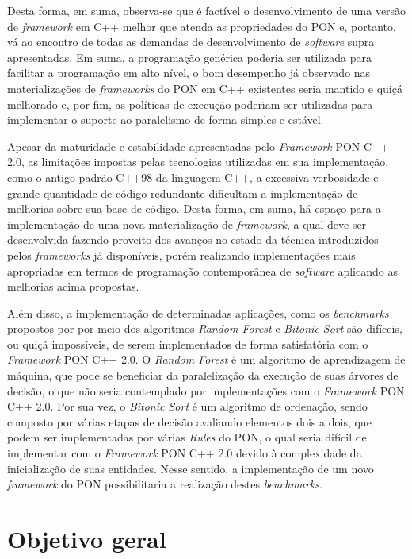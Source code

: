 Desta forma, em suma, observa-se que é factível o desenvolvimento de uma versão de
\textit{framework} em C++ melhor que atenda as propriedades do PON e, portanto,
vá ao encontro de todas as demandas de desenvolvimento de \textit{software} supra
apresentadas. Em suma, a programação genérica poderia ser utilizada para
facilitar a programação em alto nível, o bom desempenho já observado nas
materializações de \textit{frameworks} do PON em C++ existentes seria mantido e
quiçá melhorado e, por fim, as políticas de execução poderiam ser utilizadas
para implementar o suporte ao paralelismo de forma simples e estável.

Apesar da maturidade e estabilidade apresentadas pelo \textit{Framework} PON C++
2.0, as limitações impostas pelas tecnologias utilizadas em sua implementação,
como o antigo padrão C++98 da linguagem C++, a excessiva verbosidade e grande
quantidade de código redundante dificultam a implementação de melhorias sobre
sua base de código. Desta forma, em suma, há espaço para a implementação de uma
nova materialização de \textit{framework}, a qual deve ser desenvolvida fazendo
proveito dos avanços no estado da técnica introduzidos pelos \textit{frameworks}
já disponíveis, porém realizando implementações mais apropriadas em termos de
programação contemporânea de \textit{software} aplicando as melhorias acima
propostas.

Além disso, a implementação de determinadas aplicações, como os
\textit{benchmarks} propostos por  por meio dos
algoritmos \textit{Random Forest} e \textit{Bitonic Sort} são difíceis, ou quiçá
impossíveis, de serem implementados de forma satisfatória com o
\textit{Framework} PON C++ 2.0. O \textit{Random Forest} é um algoritmo de
aprendizagem de máquina, que pode se beneficiar da paralelização da execução de
suas árvores de decisão, o que não seria contemplado por implementações com o
\textit{Framework} PON C++ 2.0. Por sua vez, o \textit{Bitonic Sort} é um
algoritmo de ordenação, sendo composto por várias etapas de decisão avaliando
elementos dois a dois, que podem ser implementadas por várias \textit{Rules} do
PON, o qual seria difícil de implementar com o \textit{Framework} PON C++ 2.0
devido à complexidade da inicialização de suas entidades. Nesse sentido, a
implementação de um novo \textit{framework} do PON possibilitaria a realização
destes \textit{benchmarks}.

\section{Objetivo geral}\label{sec:obj_geral}

